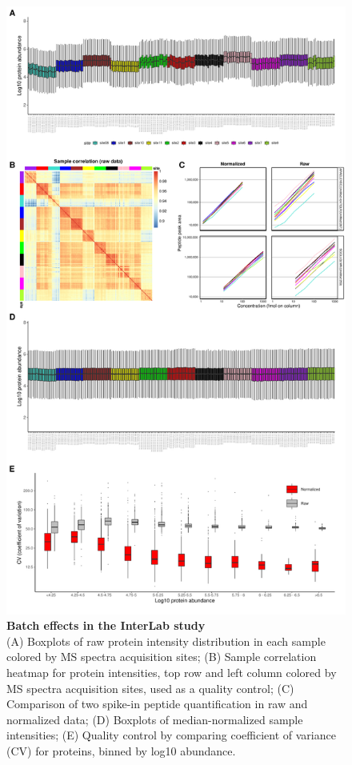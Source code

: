 \documentclass[num-refs]{wiley-article}
\begin{document}
\begin{figure}
	\centering
	\includegraphics[width=\textwidth,height=.9\textheight,keepaspectratio]{figures/Supp_InterLab.pdf}
	\caption{\textbf{Batch effects in the InterLab study}\\
		 \footnotesize  (A) Boxplots of raw protein intensity distribution in each sample colored by MS spectra acquisition sites; (B) Sample correlation heatmap for protein intensities, top row and left column colored by MS spectra acquisition sites, used as a quality control; (C) Comparison of two spike-in peptide quantification in raw and normalized data; (D) Boxplots of median-normalized sample intensities; (E) Quality control by comparing coefficient of variance (CV) for proteins, binned by log10 abundance.}
	\label{fig:batch_figS1_InterLab}
\end{figure}
\end{document}
